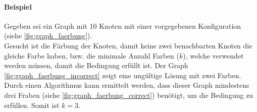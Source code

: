 	\paragraph{Beispiel}
	Gegeben sei ein Graph mit 10 Knoten mit einer vorgegebenen Konfiguration (siehe \autoref{fig:graph_faerbung}).\\
	Gesucht ist die Färbung der Knoten, damit keine zwei benachbarten Knoten die gleiche Farbe haben, bzw. die minimale Anzahl Farben ($k$), welche verwendet werden müssen, damit die Bedingung erfüllt ist. Der Graph \ref{fig:graph_faerbung_incorrect} zeigt eine ungültige Lösung mit zwei Farben. Durch einen Algorithmus kann ermittelt werden, dass dieser Graph mindestens drei Fraben (siehe \ref{fig:graph_faerbung_correct}) benötigt, um die Bedingung zu erfüllen. Somit ist $k=3$.
\begin{figure}[ht]
\centering
{}
\end{figure}

